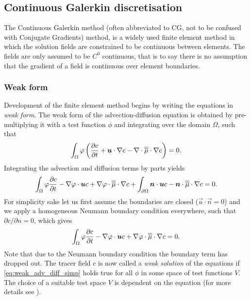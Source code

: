 \subsection{Continuous Galerkin discretisation}
\label{sect:ND_advection_diffusion_CG}

The Continuous Galerkin method (often abbreviated to CG, 
not to be confused with Conjugate Gradients) method,
is a widely used finite element method in which 
the solution fields are constrained to be
continuous between elements. 
The fields are only assumed to be $C^0$
continuous, that is to say there is no assumption that the gradient of a
field is continuous over element boundaries.

\subsubsection{Weak form}

Development of the finite element method begins by writing the equations in
\emph{weak form}.  The weak form of the advection-diffusion equation is
obtained by pre-multiplying it with a test function $\phi$
and integrating over the domain $\Omega$, such that
\begin{equation}
  \int_\Omega \varphi \left( \frac{\partial c}{\partial t} + {\mbox{\boldmath$u$}}\cdot\nabla c -
    \nabla\cdot\overline{\overline{\mu}}\cdot \nabla c\right) = 0.
\end{equation}
Integrating the advection and diffusion terms by parts yields
\begin{equation}\label{eq:weak_adv_diff}
  \int_\Omega
  \varphi \frac{\partial c}{\partial t}
  -\nabla\varphi\cdot{\mbox{\boldmath$u$}} c +
  \nabla\varphi\cdot \overline{\overline{\mu}}\cdot\nabla c
  +\int_{\partial\Omega} {\mbox{\boldmath$n$}}\cdot {\mbox{\boldmath$u$}} c
  - {\mbox{\boldmath$n$}}\cdot\overline{\overline{\mu}}\cdot\nabla c
  = 0.
\end{equation}
For simplicity sake let us first assume the boundaries are closed
($\vec{u}\cdot\vec{n}=0$) and we apply a homogeneous Neumann boundary
condition everywhere, such that $\partial c/\partial n=0$, which gives
\begin{equation}\label{eq:weak_adv_diff_simp}
  \int_\Omega \varphi \frac{\partial c}{\partial t}
    -\nabla\varphi\cdot{\mbox{\boldmath$u$}} c +
    \nabla\varphi\cdot \overline{\overline{\mu}}\cdot\nabla c = 0.
\end{equation}
Note that due to the Neumann boundary condition the boundary term has
dropped out. The tracer field $c$ is now called a \emph{weak solution} of
the equations if \eqref{eq:weak_adv_diff_simp} holds true for all $\phi$ in some
space of test functions $V$. The choice of a suitable test space $V$ is dependent
on the equation (for more details see \citet{elman2005}).

